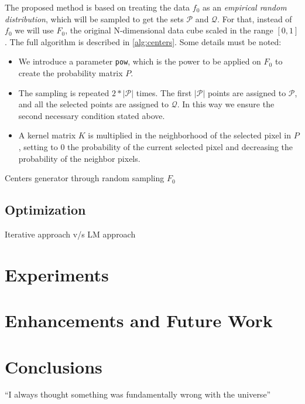\documentclass{article}
\begin{document}
The proposed method is based on treating the data $f_0$ as an \textit{empirical random distribution}, which will be sampled to get the sets $\mathcal{P}$ and $\mathcal{Q}$. For that, instead of $f_0$ we will use $F_0$, the original N-dimensional data cube scaled in the range $[0,1]$. The full algorithm is described in \ref{alg:centers}. Some details must be noted:
\begin{itemize}
\item We introduce a parameter \texttt{pow}, which is the power to be applied on $F_0$ to create the probability matrix $P$.
\item The sampling is repeated $2*|\mathcal{P}|$ times. The first $|\mathcal{P}|$ points are assigned to $\mathcal{P}$, and all the selected points are assigned to $\mathcal{Q}$. In this way we ensure the second necessary condition stated above.
\item A kernel matrix $K$ is multiplied in the neighborhood of the selected pixel in $P$, setting to $0$ the probability of the current selected pixel and decreasing the probability of the neighbor pixels.
\end{itemize}

\begin{algorithm}
\caption{Centers generator through random sampling $F_0$}\label{alg:centers}
\begin{algorithmic}[1]
\EndWhile
\EndProcedure
\end{algorithmic}
\end{algorithm}




\subsection{Optimization} \label{optimization}

Iterative approach v/s LM approach





\section{Experiments} \label{experiments}



\section{Enhancements and Future Work} \label{future}



\section{Conclusions} \label{conclusions}




``I always thought something was fundamentally wrong with the universe'' \citep{adams1995hitchhiker}



\end{document}
